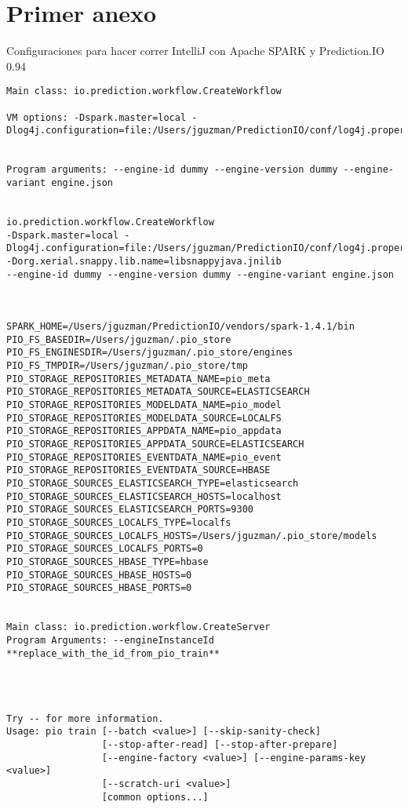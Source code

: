 \chapter{Primer anexo}
\label{ch:anexo-a}


Configuraciones para hacer correr IntelliJ con Apache SPARK y Prediction.IO 0.94


\begin{lstlisting}[frame=single,basicstyle=\ttfamily\tiny,]
Main class: io.prediction.workflow.CreateWorkflow

VM options: -Dspark.master=local -Dlog4j.configuration=file:/Users/jguzman/PredictionIO/conf/log4j.properties


Program arguments: --engine-id dummy --engine-version dummy --engine-variant engine.json


io.prediction.workflow.CreateWorkflow
-Dspark.master=local -Dlog4j.configuration=file:/Users/jguzman/PredictionIO/conf/log4j.properties -Dorg.xerial.snappy.lib.name=libsnappyjava.jnilib 
--engine-id dummy --engine-version dummy --engine-variant engine.json



SPARK_HOME=/Users/jguzman/PredictionIO/vendors/spark-1.4.1/bin
PIO_FS_BASEDIR=/Users/jguzman/.pio_store
PIO_FS_ENGINESDIR=/Users/jguzman/.pio_store/engines
PIO_FS_TMPDIR=/Users/jguzman/.pio_store/tmp
PIO_STORAGE_REPOSITORIES_METADATA_NAME=pio_meta
PIO_STORAGE_REPOSITORIES_METADATA_SOURCE=ELASTICSEARCH
PIO_STORAGE_REPOSITORIES_MODELDATA_NAME=pio_model
PIO_STORAGE_REPOSITORIES_MODELDATA_SOURCE=LOCALFS
PIO_STORAGE_REPOSITORIES_APPDATA_NAME=pio_appdata
PIO_STORAGE_REPOSITORIES_APPDATA_SOURCE=ELASTICSEARCH
PIO_STORAGE_REPOSITORIES_EVENTDATA_NAME=pio_event
PIO_STORAGE_REPOSITORIES_EVENTDATA_SOURCE=HBASE
PIO_STORAGE_SOURCES_ELASTICSEARCH_TYPE=elasticsearch
PIO_STORAGE_SOURCES_ELASTICSEARCH_HOSTS=localhost
PIO_STORAGE_SOURCES_ELASTICSEARCH_PORTS=9300
PIO_STORAGE_SOURCES_LOCALFS_TYPE=localfs
PIO_STORAGE_SOURCES_LOCALFS_HOSTS=/Users/jguzman/.pio_store/models
PIO_STORAGE_SOURCES_LOCALFS_PORTS=0
PIO_STORAGE_SOURCES_HBASE_TYPE=hbase
PIO_STORAGE_SOURCES_HBASE_HOSTS=0
PIO_STORAGE_SOURCES_HBASE_PORTS=0


Main class: io.prediction.workflow.CreateServer
Program Arguments: --engineInstanceId **replace_with_the_id_from_pio_train**




Try -- for more information.
Usage: pio train [--batch <value>] [--skip-sanity-check]
                 [--stop-after-read] [--stop-after-prepare]
                 [--engine-factory <value>] [--engine-params-key <value>]
                 [--scratch-uri <value>]
                 [common options...]


\end{lstlisting}
